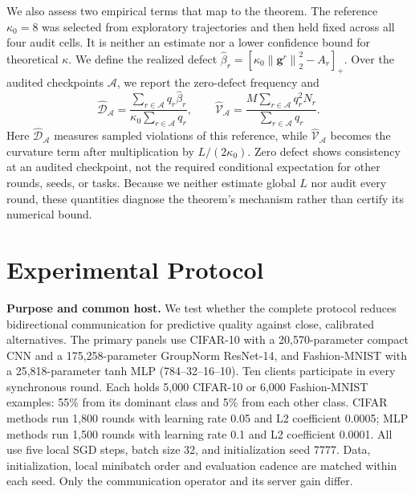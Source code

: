 \documentclass[conference]{IEEEtran}
\newcommand{\norm}[1]{\left\lVert#1\right\rVert}
\newcommand{\vect}[1]{\boldsymbol{#1}}
\newcommand{\reviewrev}[1]{#1}
\newcommand{\mlpColor}{\color{mlporange}}
\newcommand{\mlpRev}[1]{{\mlpColor #1}}
\begin{document}
\reviewrev{We also assess two empirical terms that map to the theorem. The
reference $\kappa_0=8$ was selected from exploratory trajectories and then held
fixed across all four audit cells. It is neither an estimate nor a lower
confidence bound for theoretical $\kappa$. We define the realized defect
$\widehat\beta_r=[\kappa_0\norm{\vect{g}^r}_2^2-A_r]_+$. Over the audited
checkpoints $\mathcal A$, we report the zero-defect frequency and
\begin{equation}
 \widehat{\mathcal D}_{\mathcal A}
 =\frac{\sum_{r\in\mathcal A}q_r\widehat\beta_r}
 {\kappa_0\sum_{r\in\mathcal A}q_r},\qquad
 \widehat{\mathcal V}_{\mathcal A}
 =\frac{M\sum_{r\in\mathcal A}q_r^2N_r}
 {\sum_{r\in\mathcal A}q_r}.
 \label{eq:empirical-theorem-diagnostics}
\end{equation}
Here $\widehat{\mathcal D}_{\mathcal A}$ measures sampled violations of this
reference, while $\widehat{\mathcal V}_{\mathcal A}$ becomes the curvature term
after multiplication by $L/(2\kappa_0)$. Zero defect shows consistency at an
audited checkpoint, not the required conditional expectation for other rounds,
seeds, or tasks. Because we neither estimate global $L$ nor audit every round,
these quantities diagnose the theorem's mechanism rather than certify its
numerical bound.}



\section{Experimental Protocol}
\label{sec:experiments}

\mlpRev{\textbf{Purpose and common host.}
We test whether the complete protocol reduces bidirectional communication for
predictive quality against close, calibrated alternatives. The primary panels
use CIFAR-10 with a 20,570-parameter compact CNN and a 175,258-parameter
GroupNorm ResNet-14, and Fashion-MNIST with a 25,818-parameter tanh MLP
(784--32--16--10). Ten clients participate in every synchronous round.
Each holds 5,000 CIFAR-10 or 6,000 Fashion-MNIST examples: 55\% from its
dominant class and 5\% from each other class. CIFAR methods run 1,800 rounds
with learning rate 0.05 and L2 coefficient 0.0005; MLP methods run 1,500 rounds
with learning rate 0.1 and L2 coefficient 0.0001. All use five local SGD steps,
batch size 32, and initialization seed 7777. Data, initialization,
local minibatch order and evaluation cadence are matched within each seed.
Only the communication operator and its server gain differ.}
\end{document}
